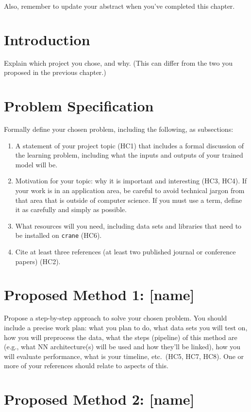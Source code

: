 \documentclass{report}
\begin{document}
Also, remember to update your abstract when you've completed this chapter. 

\section{Introduction}

Explain which project you chose, and why. (This can differ from the two you proposed in the previous chapter.) 

\section{Problem Specification}

Formally define your chosen problem, including the following, as subsections:
\begin{enumerate}
    \item A  statement of your project topic (HC1) that includes a formal discussion of the learning problem, including what the inputs and outputs of your trained model will be.
    \item Motivation for your topic: why it is important and interesting (HC3, HC4). If your work is in an application area, be careful to avoid technical jargon from that area that is outside of computer science. If you must use a term, define it as carefully and simply as possible.
   \item What resources will you need, including data sets and libraries that need to be installed on {\tt crane} (HC6).
   \item Cite at least three references (at least two published journal or conference papers) (HC2).
\end{enumerate}

\section{Proposed Method 1: [name]}

Propose a step-by-step approach to solve your chosen problem.  You should include 
a precise work plan: what you plan to do, what data sets you will test on, how you will preprocess the data, what the steps (pipeline) of this method are (e.g., what NN architecture(s) will be used and how they'll be linked), how you will evaluate performance, what is your timeline, etc.\ (HC5, HC7, HC8).  One or more of your references should relate to aspects of this. 


\section{Proposed Method 2: [name]}
\end{document}
